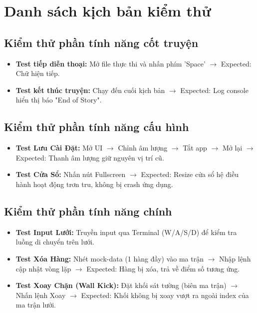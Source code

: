 \documentclass[12pt,a4paper]{article}
\begin{document}
\section{Danh sách kịch bản kiểm thử}

\subsection{Kiểm thử phần tính năng cốt truyện}
\begin{itemize}
    \item \textbf{Test tiếp diễn thoại:} Mở file thực thi và nhấn phím 'Space' $\rightarrow$ Expected: Chữ hiện tiếp.
    \item \textbf{Test kết thúc truyện:} Chạy đến cuối kịch bản $\rightarrow$ Expected: Log console hiển thị báo "End of Story".
\end{itemize}

\subsection{Kiểm thử phần tính năng cấu hình}
\begin{itemize}
    \item \textbf{Test Lưu Cài Đặt:} Mở UI $\rightarrow$ Chỉnh âm lượng $\rightarrow$ Tắt app $\rightarrow$ Mở lại $\rightarrow$ Expected: Thanh âm lượng giữ nguyên vị trí cũ.
    \item \textbf{Test Cửa Sổ:} Nhấn nút Fullscreen $\rightarrow$ Expected: Resize cửa sổ hệ điều hành hoạt động trơn tru, không bị crash ứng dụng.
\end{itemize}

\subsection{Kiểm thử phần tính năng chính}
\begin{itemize}
    \item \textbf{Test Input Lưới:} Truyền input qua Terminal (W/A/S/D) để kiểm tra luồng di chuyển trên lưới.
    \item \textbf{Test Xóa Hàng:} Nhét mock-data (1 hàng đầy) vào ma trận $\rightarrow$ Nhập lệnh cập nhật vòng lặp $\rightarrow$ Expected: Hàng bị xóa, trả về điểm số tương ứng.
    \item \textbf{Test Xoay Chặn (Wall Kick):} Đặt khối sát tường (biên ma trận) $\rightarrow$ Nhấn lệnh Xoay $\rightarrow$ Expected: Khối không bị xoay vượt ra ngoài index của ma trận lưới.
\end{itemize}

\label{LastPageTestList}
\end{document}
